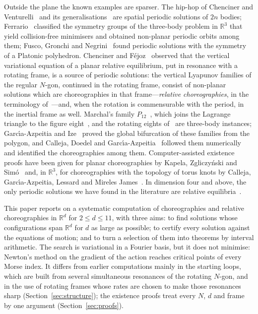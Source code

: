 \documentclass[11pt]{amsart}
\theoremstyle{definition}
\newcommand{\R}{\mathbb{R}}
\begin{document}
Outside the plane the known examples are sparser. The hip-hop of Chenciner and Venturelli~\cite{ChencinerVenturelli2000} and its generalisations~\cite{TerraciniVenturelli2007} are spatial periodic solutions of $2n$ bodies; Ferrario~\cite{Ferrario2006} classified the symmetry groups of the three-body problem in $\R^3$ that yield collision-free minimisers and obtained non-planar periodic orbits among them; Fusco, Gronchi and Negrini~\cite{FGN2011} found periodic solutions with the symmetry of a Platonic polyhedron. Chenciner and F\'ejoz~\cite{ChencinerFejoz2005,ChencinerFejoz2009} observed that the vertical variational equation of a planar relative equilibrium, put in resonance with a rotating frame, is a source of periodic solutions: the vertical Lyapunov families of the regular $N$-gon, continued in the rotating frame, consist of non-planar solutions which are choreographies in that frame---\emph{relative choreographies}, in the terminology of~\cite{Chenciner2002ICM,CFM2005}---and, when the rotation is commensurable with the period, in the inertial frame as well. Marchal's family $P_{12}$~\cite{Marchal2000}, which joins the Lagrange triangle to the figure eight~\cite{CGHLM2024}, and the rotating eights of~\cite{CFM2005} are three-body instances; Garc\'{\i}a-Azpeitia and Ize~\cite{GarciaAzpeitiaIze2013} proved the global bifurcation of these families from the polygon, and Calleja, Doedel and Garc\'{\i}a-Azpeitia~\cite{CDG2018} followed them numerically and identified the choreographies among them. Computer-assisted existence proofs have been given for planar choreographies by Kapela, Zgliczy\'nski and Sim\'o~\cite{KapelaZgliczynski2003,KapelaSimo2007} and, in $\R^3$, for choreographies with the topology of torus knots by Calleja, Garc\'{\i}a-Azpeitia, Lessard and Mireles James~\cite{CGLM2021}. In dimension four and above, the only periodic solutions we have found in the literature are relative equilibria~\cite{AlbouyChenciner1998}.

This paper reports on a systematic computation of choreographies and relative choreographies in $\R^d$ for $2\le d\le11$, with three aims: to find solutions whose configurations span $\R^d$ for $d$ as large as possible; to certify every solution against the equations of motion; and to turn a selection of them into theorems by interval arithmetic. The search is variational in a Fourier basis, but it does not minimise: Newton's method on the gradient of the action reaches critical points of every Morse index. It differs from earlier computations mainly in the starting loops, which are built from several simultaneous resonances of the rotating $N$-gon, and in the use of rotating frames whose rates are chosen to make those resonances sharp (Section~\ref{sec:structure}); the existence proofs treat every $N$, $d$ and frame by one argument (Section~\ref{sec:proofs}).
\end{document}
